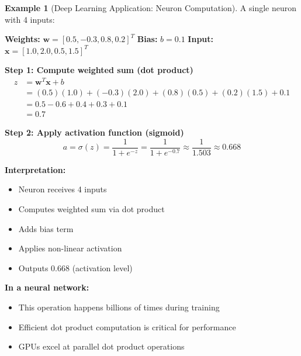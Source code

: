 \documentclass[12pt,a4paper]{article}
\theoremstyle{definition}
\newtheorem{example}{Example}[section]
\begin{document}
\begin{example}[Deep Learning Application: Neuron Computation]
A single neuron with 4 inputs:

\textbf{Weights:} $\mathbf{w} = [0.5, -0.3, 0.8, 0.2]^T$
\textbf{Bias:} $b = 0.1$
\textbf{Input:} $\mathbf{x} = [1.0, 2.0, 0.5, 1.5]^T$

\textbf{Step 1: Compute weighted sum (dot product)}
\begin{align}
z &= \mathbf{w}^T\mathbf{x} + b \\
&= (0.5)(1.0) + (-0.3)(2.0) + (0.8)(0.5) + (0.2)(1.5) + 0.1 \\
&= 0.5 - 0.6 + 0.4 + 0.3 + 0.1 \\
&= 0.7
\end{align}

\textbf{Step 2: Apply activation function (sigmoid)}
\begin{equation}
a = \sigma(z) = \frac{1}{1 + e^{-z}} = \frac{1}{1 + e^{-0.7}} \approx \frac{1}{1.503} \approx 0.668
\end{equation}

\textbf{Interpretation:}
\begin{itemize}
    \item Neuron receives 4 inputs
    \item Computes weighted sum via dot product
    \item Adds bias term
    \item Applies non-linear activation
    \item Outputs 0.668 (activation level)
\end{itemize}

\textbf{In a neural network:}
\begin{itemize}
    \item This operation happens billions of times during training
    \item Efficient dot product computation is critical for performance
    \item GPUs excel at parallel dot product operations
\end{itemize}
\end{example}
\end{document}
